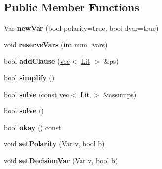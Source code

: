\subsection*{\-Public \-Member \-Functions}
\begin{DoxyCompactItemize}
\item 
\hypertarget{classminisat_1_1Solver_acaa799fb7a3b4d8c029a3a00bcf66592}{\-Var {\bfseries new\-Var} (bool polarity=true, bool dvar=true)}\label{classminisat_1_1Solver_acaa799fb7a3b4d8c029a3a00bcf66592}

\item 
\hypertarget{classminisat_1_1Solver_a60e864b871d48c56ce25222dfc12f482}{void {\bfseries reserve\-Vars} (int num\-\_\-vars)}\label{classminisat_1_1Solver_a60e864b871d48c56ce25222dfc12f482}

\item 
\hypertarget{classminisat_1_1Solver_afa9a41efb60934554ee0d1088feddb25}{bool {\bfseries add\-Clause} (\hyperlink{classvec}{vec}$<$ \hyperlink{classminisat_1_1Lit}{\-Lit} $>$ \&ps)}\label{classminisat_1_1Solver_afa9a41efb60934554ee0d1088feddb25}

\item 
\hypertarget{classminisat_1_1Solver_ad1a30caa31b68223f269026a9ae6938e}{bool {\bfseries simplify} ()}\label{classminisat_1_1Solver_ad1a30caa31b68223f269026a9ae6938e}

\item 
\hypertarget{classminisat_1_1Solver_ab9c22c13ea75fe01d03cdc2c04291580}{bool {\bfseries solve} (const \hyperlink{classvec}{vec}$<$ \hyperlink{classminisat_1_1Lit}{\-Lit} $>$ \&assumps)}\label{classminisat_1_1Solver_ab9c22c13ea75fe01d03cdc2c04291580}

\item 
\hypertarget{classminisat_1_1Solver_ab94b515674d8606b96036cb985872532}{bool {\bfseries solve} ()}\label{classminisat_1_1Solver_ab94b515674d8606b96036cb985872532}

\item 
\hypertarget{classminisat_1_1Solver_ace28147fe166b1e64ab263e9e95b17e6}{bool {\bfseries okay} () const }\label{classminisat_1_1Solver_ace28147fe166b1e64ab263e9e95b17e6}

\item 
\hypertarget{classminisat_1_1Solver_aeb7eac8e1304ae120be4a1aecccc3e72}{void {\bfseries set\-Polarity} (\-Var v, bool b)}\label{classminisat_1_1Solver_aeb7eac8e1304ae120be4a1aecccc3e72}

\item 
\hypertarget{classminisat_1_1Solver_a9e222d3293b7eb02266e03b96ca7ec9e}{void {\bfseries set\-Decision\-Var} (\-Var v, bool b)}\label{classminisat_1_1Solver_a9e222d3293b7eb02266e03b96ca7ec9e}


\end{DoxyCompactItemize}
